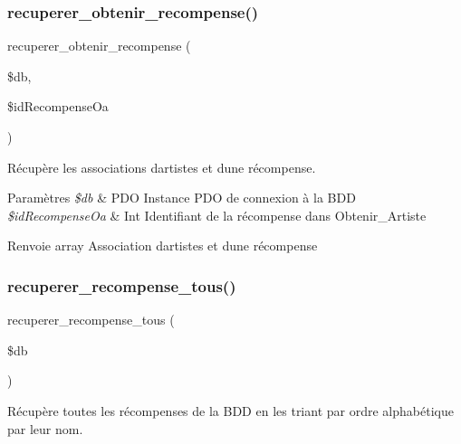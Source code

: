 \subsubsection{\texorpdfstring{recuperer\+\_\+obtenir\+\_\+recompense()}{recuperer\_obtenir\_recompense()}}
{\footnotesize\ttfamily recuperer\+\_\+obtenir\+\_\+recompense (\begin{DoxyParamCaption}\item[{}]{\$db,  }\item[{}]{\$id\+Recompense\+Oa }\end{DoxyParamCaption})}



Récupère les associations d\textquotesingle{}artistes et d\textquotesingle{}une récompense. 


\begin{DoxyParams}{Paramètres}
{\em \$db} & P\+DO Instance P\+DO de connexion à la B\+DD \\
\hline
{\em \$id\+Recompense\+Oa} & Int Identifiant de la récompense dans Obtenir\+\_\+\+Artiste \\
\hline
\end{DoxyParams}
\begin{DoxyReturn}{Renvoie}
array Association d\textquotesingle{}artistes et d\textquotesingle{}une récompense 
\end{DoxyReturn}
\mbox{\label{fonctionRecompense_8php_a6c6e61a81a44c39645205f2699c030c2}} 
\subsubsection{\texorpdfstring{recuperer\+\_\+recompense\+\_\+tous()}{recuperer\_recompense\_tous()}}
{\footnotesize\ttfamily recuperer\+\_\+recompense\+\_\+tous (\begin{DoxyParamCaption}\item[{}]{\$db }\end{DoxyParamCaption})}



Récupère toutes les récompenses de la B\+DD en les triant par ordre alphabétique par leur nom. 


